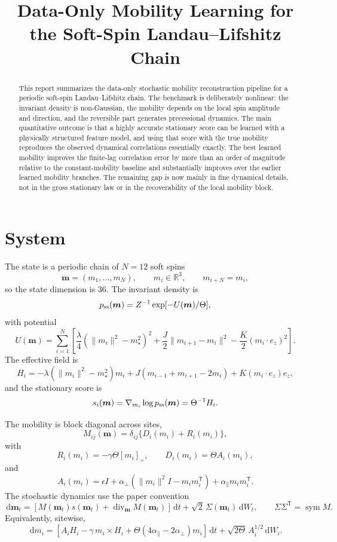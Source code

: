 \documentclass[11pt]{article}
\title{Data-Only Mobility Learning for the Soft-Spin Landau--Lifshitz Chain}
\author{}
\date{}
\newcommand{\R}{\mathbb{R}}
\newcommand{\dd}{\,\mathrm{d}}
\newcommand{\T}{\mathsf{T}}
\begin{document}
\maketitle

\begin{abstract}
This report summarizes the data-only stochastic mobility reconstruction pipeline
for a periodic soft-spin Landau--Lifshitz chain.  The benchmark is deliberately
nonlinear: the invariant density is non-Gaussian, the mobility depends on the
local spin amplitude and direction, and the reversible part generates
precessional dynamics.  The main quantitative outcome is that a highly accurate
stationary score can be learned with a physically structured feature model, and
using that score with the true mobility reproduces the observed dynamical
correlations essentially exactly.  The best learned mobility improves the
finite-lag correlation error by more than an order of magnitude relative to the
constant-mobility baseline and substantially improves over the earlier learned
mobility branches.  The remaining gap is now mainly in fine dynamical details,
not in the gross stationary law or in the recoverability of the local mobility
block.
\end{abstract}

\section{System}

The state is a periodic chain of $N=12$ soft spins
\[
  \bm m=(m_1,\ldots,m_N), \qquad m_i\in\R^3,\qquad m_{i+N}=m_i,
\]
so the state dimension is $36$.  The invariant density is
\[
  p_{\rm ss}(\bm m) = Z^{-1}\exp[-U(\bm m)/\Theta],
\]
with potential
\[
  U(\bm m)
  =
  \sum_{i=1}^N
  \left[
    \frac{\lambda}{4}\left(\|m_i\|^2-m_\star^2\right)^2
    + \frac{J}{2}\|m_{i+1}-m_i\|^2
    - \frac{K}{2}(m_i\cdot e_z)^2
  \right].
\]
The effective field is
\[
  H_i
  =
  -\lambda\left(\|m_i\|^2-m_\star^2\right)m_i
  + J(m_{i-1}+m_{i+1}-2m_i)
  + K(m_i\cdot e_z)e_z,
\]
and the stationary score is
\[
  s_i(\bm m)=\nabla_{m_i}\log p_{\rm ss}(\bm m)=\Theta^{-1}H_i.
\]

The mobility is block diagonal across sites,
\[
  M_{ij}(\bm m)=\delta_{ij}\{D_i(m_i)+R_i(m_i)\},
\]
with
\[
  R_i(m_i)=-\gamma\Theta [m_i]_\times,
  \qquad
  D_i(m_i)=\Theta A_i(m_i),
\]
and
\[
  A_i(m_i)=
  \epsilon I
  + \alpha_\perp\left(\|m_i\|^2I-m_i m_i^\T\right)
  + \alpha_\parallel m_i m_i^\T .
\]
The stochastic dynamics use the paper convention
\[
  \dd \bm m_t =
  \left[
    M(\bm m_t)s(\bm m_t)
    + \operatorname{div}_{\bm m}M(\bm m_t)
  \right]\dd t
  + \sqrt{2}\,\Sigma(\bm m_t)\dd W_t,
  \qquad
  \Sigma\Sigma^\T=\operatorname{sym}M.
\]
Equivalently, sitewise,
\[
  \dd m_i =
  \left[
    A_i H_i
    - \gamma\, m_i\times H_i
    + \Theta(4\alpha_\parallel-2\alpha_\perp)m_i
  \right]\dd t
  + \sqrt{2\Theta}\,A_i^{1/2}\dd W_i .
\]
\end{document}
